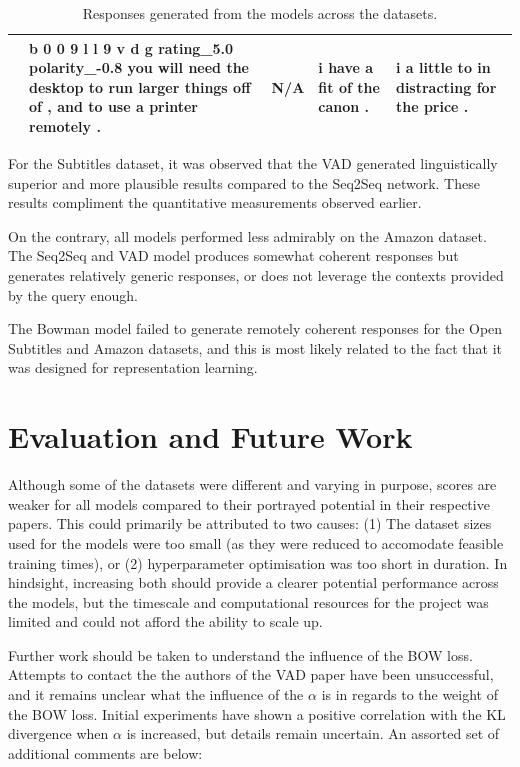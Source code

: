 \documentclass[12pt,twoside]{report}
\begin{document}
\begin{table}[!ht]
\begin{tabular}{|p{1.5cm}|p{2.8cm}|p{2.8cm}|p{2.8cm}|p{2.8cm}|}
													 & b 0 0 9 l l 9 v d g rating\_5.0 polarity\_-0.8 you will need the desktop to run larger things off of , and to use a printer remotely . & N/A                                                       & i have a fit of the canon .                                        & i a little to in distracting for the price .                               \\ \hline
	\end{tabular}
	\caption{Responses generated from the models across the datasets.}
	\label{qualitative_table}
\end{table}

For the Subtitles dataset, it was observed that the VAD generated linguistically superior and more plausible results compared to the Seq2Seq network. These results compliment the quantitative measurements observed earlier.

On the contrary, all models performed less admirably on the Amazon dataset. The Seq2Seq and VAD model produces somewhat coherent responses but generates relatively generic responses, or does not leverage the contexts provided by the query enough.

The Bowman model failed to generate remotely coherent responses for the Open Subtitles and Amazon datasets, and this is most likely related to the fact that it was designed for representation learning.

\chapter{Evaluation and Future Work}

Although some of the datasets were different and varying in purpose, scores are weaker for all models compared to their portrayed potential in their respective papers. This could primarily be attributed to two causes: (1) The dataset sizes used for the models were too small (as they were reduced to accomodate feasible training times), or (2) hyperparameter optimisation was too short in duration. In hindsight, increasing both should provide a clearer potential performance across the models, but the timescale and computational resources for the project was limited and could not afford the ability to scale up.

Further work should be taken to understand the influence of the BOW loss. Attempts to contact the the authors of the VAD paper have been unsuccessful, and it remains unclear what the influence of the $\alpha$ is in regards to the weight of the BOW loss. Initial experiments have shown a positive correlation with the KL divergence when $\alpha$ is increased, but details remain uncertain. An assorted set of additional comments are below:
\end{document}
